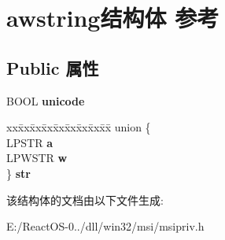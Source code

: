 \hypertarget{structawstring}{}\section{awstring结构体 参考}
\label{structawstring}
\subsection*{Public 属性}
\begin{DoxyCompactItemize}
\item 
\mbox{\label{structawstring_abcd7dbcf4c013f7e570ab1beb7a43bee}} 
B\+O\+OL {\bfseries unicode}
\item 
\mbox{\label{structawstring_af15698fa93d6994dea6f45e5061f2cab}} 
\begin{tabbing}
xx\=xx\=xx\=xx\=xx\=xx\=xx\=xx\=xx\=\kill
union \{\\
\>LPSTR {\bfseries a}\\
\>LPWSTR {\bfseries w}\\
\} {\bfseries str}\\

\end{tabbing}\end{DoxyCompactItemize}


该结构体的文档由以下文件生成\+:\begin{DoxyCompactItemize}
\item 
E\+:/\+React\+O\+S-\/0../dll/win32/msi/msipriv.\+h\end{DoxyCompactItemize}
